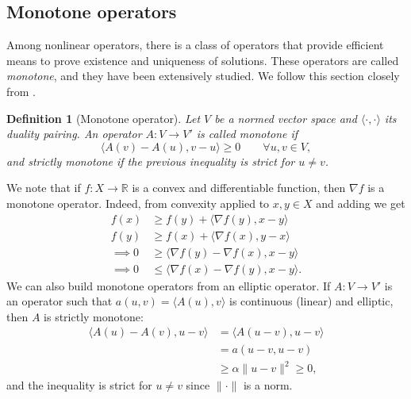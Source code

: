 \documentclass{article}
\newtheorem{definition}{Definition}
\newcommand{\R}{\mathbb{R}}
\begin{document}
\subsection{Monotone operators}
Among nonlinear operators, there is a class of operators that provide efficient means to prove existence and uniqueness of solutions. These operators are called \textit{monotone}, and they have been extensively studied. We follow this section closely from \cite{ciarlet2013linear}.
\begin{definition}[Monotone operator]
    Let $V$ be a normed vector space and $\langle\cdot,\cdot\rangle$ its duality pairing. An operator $A:V\to V'$ is called monotone if
    \begin{equation*}
        \langle A(v)-A(u),v-u\rangle \geq 0 \qquad \forall u,v\in V,
    \end{equation*}
    and strictly monotone if the previous inequality is strict for $u\neq v$.
\end{definition}
We note that if $f:X\to \R$ is a convex and differentiable function, then $\nabla f$ is a monotone operator. Indeed, from convexity applied to $x,y\in X$ and adding we get
\begin{align*}
    f(x) &\geq f(y) + \langle \nabla f(y), x-y\rangle\\
    f(y) &\geq f(x) + \langle \nabla f(x), y-x\rangle\\
    \implies 0 &\geq \langle \nabla f(y)-\nabla f(x),x-y\rangle \\
    \implies 0&\leq \langle \nabla f(x)-\nabla f(y),x-y\rangle.
\end{align*}
We can also build monotone operators from an elliptic operator. If $A:V\to V'$ is an operator such that $a(u,v) = \langle A(u),v\rangle$ is continuous (linear) and elliptic, then $A$ is strictly monotone:
\begin{align*}
    \langle A(u)-A(v),u-v\rangle &= \langle A(u-v), u-v\rangle\\
    &= a(u-v,u-v)\\
    &\geq \alpha \|u-v\|^2 \geq 0,
\end{align*}
and the inequality is strict for $u\neq v$ since $\|\cdot\|$ is a norm. 
\end{document}
